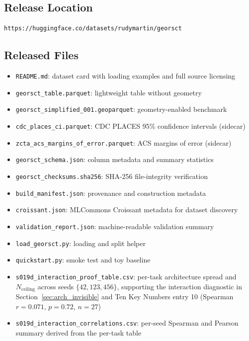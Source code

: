 \documentclass{article}
\begin{document}
\subsection{Release Location}

\begin{verbatim}
https://huggingface.co/datasets/rudymartin/georsct
\end{verbatim}

\subsection{Released Files}

\begin{itemize}
\item \texttt{README.md}: dataset card with loading examples and full source licensing
\item \texttt{georsct\_table.parquet}: lightweight table without geometry
\item \texttt{georsct\_simplified\_001.geoparquet}: geometry-enabled benchmark
\item \texttt{cdc\_places\_ci.parquet}: CDC PLACES 95\% confidence intervals (sidecar)
\item \texttt{zcta\_acs\_margins\_of\_error.parquet}: ACS margins of error (sidecar)
\item \texttt{georsct\_schema.json}: column metadata and summary statistics
\item \texttt{georsct\_checksums.sha256}: SHA-256 file-integrity verification
\item \texttt{build\_manifest.json}: provenance and construction metadata
\item \texttt{croissant.json}: MLCommons Croissant metadata for dataset discovery
\item \texttt{validation\_report.json}: machine-readable validation summary
\item \texttt{load\_georsct.py}: loading and split helper
\item \texttt{quickstart.py}: smoke test and toy baseline
\item \texttt{s019d\_interaction\_proof\_table.csv}: per-task architecture spread and $N_{\text{ceiling}}$ across seeds $\{42, 123, 456\}$, supporting the interaction diagnostic in Section~\ref{sec:arch_invisible} and Ten Key Numbers entry 10 (Spearman $r = 0.071$, $p = 0.72$, $n = 27$)
\item \texttt{s019d\_interaction\_correlations.csv}: per-seed Spearman and Pearson summary derived from the per-task table

\end{itemize}
\end{document}
